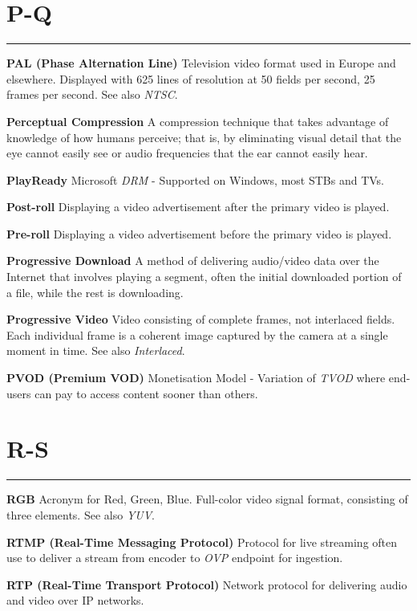 \section{P-Q}
\hrule

\medskip
\textbf{PAL (Phase Alternation Line)}
Television video format used in Europe and elsewhere. Displayed with 625 lines of resolution at 50 fields per second, 25 frames per second. See also \textit{NTSC}.

\smallskip
\textbf{Perceptual Compression}
A compression technique that takes advantage of knowledge of how humans perceive; that is, by eliminating visual detail that the eye cannot easily see or audio frequencies that the ear cannot easily hear.

\smallskip
\textbf{PlayReady}
Microsoft \textit{DRM} - Supported on Windows, most STBs and TVs.

\smallskip
\textbf{Post-roll}
Displaying a video advertisement after the primary video is played.

\smallskip
\textbf{Pre-roll}
Displaying a video advertisement before the primary video is played.

\smallskip
\textbf{Progressive Download}
A method of delivering audio/video data over the Internet that involves playing a segment, often the initial downloaded portion of a file, while the rest is downloading.

\smallskip
\textbf{Progressive Video}
Video consisting of complete frames, not interlaced fields. Each individual frame is a coherent image captured by the camera at a single moment in time. See also \textit{Interlaced}.

\smallskip
\textbf{PVOD (Premium VOD)}
Monetisation Model - Variation of \textit{TVOD} where end-users can pay to access content sooner than others.


\section{R-S}
\hrule

\medskip
\textbf{RGB}
Acronym for Red, Green, Blue. Full-color video signal format, consisting of three elements. See also \textit{YUV}.

\smallskip
\textbf{RTMP (Real-Time Messaging Protocol)}
Protocol for live streaming often use to deliver a stream from encoder to \textit{OVP} endpoint for ingestion.

\smallskip
\textbf{RTP (Real-Time Transport Protocol)}
Network protocol for delivering audio and video over IP networks.

